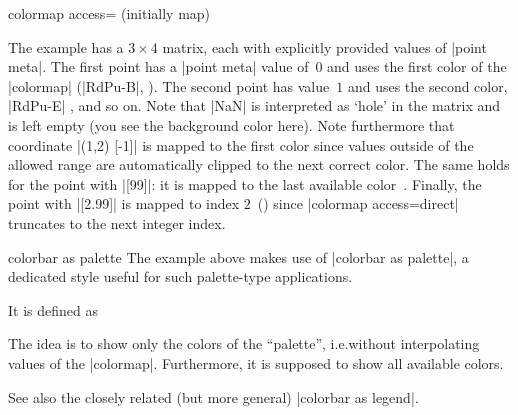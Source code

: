 \begin{pgfplotskey}{colormap access= (initially map)%
}
\begin{codeexample}[]
\end{codeexample}
    The example has a $3\times 4$ matrix, each with explicitly provided values
    of |point meta|. The first point has a |point meta| value of~$0$ and uses
    the first color of the |colormap| (|RdPu-B|, ). The
    second point has value~$1$ and uses the second color, |RdPu-E|
    , and so on. Note that |NaN| is interpreted as `hole' in
    the matrix and is left empty (you see the background color here). Note
    furthermore that coordinate |(1,2) [-1]| is mapped to the first color since
    values outside of the allowed range are automatically clipped to the next
    correct color. The same holds for the point with |[99]|: it is mapped to
    the last available color~. Finally, the point with
    |[2.99]| is mapped to index $2$~() since
    |colormap access=direct| truncates to the next integer index.

    \begin{pgfplotskey}{colorbar as palette}
        The example above makes use of |colorbar as palette|, a dedicated style
        useful for such palette-type applications.

        It is defined as
\begin{codeexample}
\end{codeexample}
        The idea is to show only the colors of the ``palette'', i.e.\@ without
        interpolating values of the |colormap|. Furthermore, it is supposed to
        show all available colors.

        See also the closely related (but more general) |colorbar as legend|.
\end{pgfplotskey}


\end{pgfplotskey}
